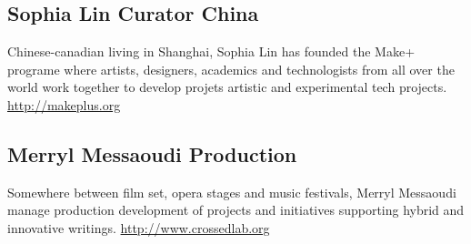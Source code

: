 \bigskip

\subsection{Sophia Lin Curator China}
Chinese-canadian living in Shanghai, Sophia Lin has founded the Make+
programe where artists, designers, academics and technologists from all
over the world work together to develop projets artistic and
experimental tech projects.~
\href{http://makeplus.org/}{http://makeplus.org}

\subsection{Merryl Messaoudi Production}
Somewhere between film set, opera stages and music festivals, Merryl
Messaoudi manage production development of projects and initiatives
supporting hybrid and innovative writings. 
\href{http://www.crossedlab.org/}{http://www.crossedlab.org}
\endinput
